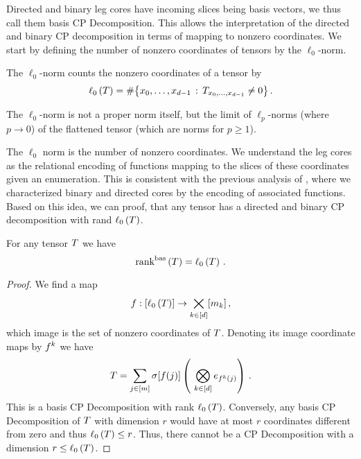 \label{sec:basisCP}



Directed and binary leg cores have incoming slices being basis vectors, we thus call them basis CP Decomposition.
This allows the interpretation of the directed and binary CP decomposition in terms of mapping to nonzero coordinates.
We start by defining the number of nonzero coordinates of tensors by the $\ell_0$-norm.

\begin{definition}
	The $\ell_0$-norm counts the nonzero coordinates of a tensor by
		\[ \ell_0\left(T\right) = \#\big\{ x_{0},\ldots,x_{d-1} \, : \, T_{x_{0},\ldots,x_{d-1} }\neq 0 \big\} \, . \]
\end{definition}

The $\ell_0$-norm is not a proper norm itself, but the limit of $\ell_p$-norms (where $p \rightarrow 0$) of the flattened tensor (which are norms for $p\geq1$).

The $\ell_0$ norm is the number of nonzero coordinates. 
We understand the leg cores as the relational encoding of functions mapping to the slices of these coordinates given an enumeration.
This is consistent with the previous analysis of , where we characterized binary and directed cores by the encoding of associated functions.
Based on this idea, we can proof, that any tensor has a directed and binary CP decomposition with rand $\ell_0\left(T\right)$.


\begin{theorem}\label{the:sparseBasisCP}
	For any tensor $T$ we have
		\[ \mathrm{rank}^{\mathrm{bas}}\left(T\right) = \ell_0\left(T\right) \, .  \]	
\end{theorem}
\begin{proof}
	We find a map 
		\[ f : [\ell_0\left(T\right)] \rightarrow  \bigtimes_{k\in[d]}[m_{k}] \, , \] 
	which image is the set of nonzero coordinates of $T$.
	Denoting its image coordinate maps by $f^{k}$ we have
		\[ \hypercore = \sum_{\datindexin} \scalarcoreof{\exfunction(\datindex)} \left( \bigotimes_{\atomenumeratorin} \onehotmapof{\exfunction^\atomenumerator(\datindex)} \right) \, . \]
	This is a basis CP Decomposition with rank $\ell_0\left(T\right)$.
	Conversely, any basis CP Decomposition of $T$ with dimension $r$ would have at most $r$ coordinates different from zero and thus $\ell_0\left(T\right)\leq r$.
	Thus, there cannot be a CP Decomposition with a dimension $r\leq\ell_0\left(T\right)$.
\end{proof}

